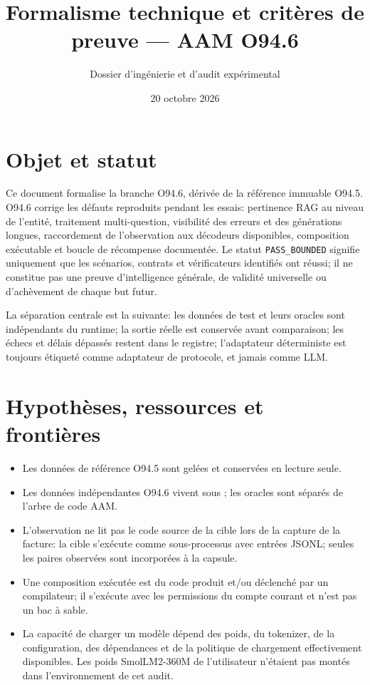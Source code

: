 \documentclass[11pt,a4paper]{article}
\title{Formalisme technique et critères de preuve — AAM O94.6}
\author{Dossier d'ingénierie et d'audit expérimental}
\date{20 octobre 2026}
\begin{document}
\maketitle
\tableofcontents
\section{Objet et statut}
Ce document formalise la branche O94.6, dérivée de la référence immuable O94.5. O94.6 corrige les défauts reproduits pendant les essais: pertinence RAG au niveau de l'entité, traitement multi-question, visibilité des erreurs et des générations longues, raccordement de l'observation aux décodeurs disponibles, composition exécutable et boucle de récompense documentée. Le statut \texttt{PASS\_BOUNDED} signifie uniquement que les scénarios, contrats et vérificateurs identifiés ont réussi; il ne constitue pas une preuve d'intelligence générale, de validité universelle ou d'achèvement de chaque but futur.

La séparation centrale est la suivante: les données de test et leurs oracles sont indépendants du runtime; la sortie réelle est conservée avant comparaison; les échecs et délais dépassés restent dans le registre; l'adaptateur déterministe est toujours étiqueté comme adaptateur de protocole, et jamais comme LLM.

\section{Hypothèses, ressources et frontières}
\begin{itemize}[leftmargin=1.5em]
\item Les données de référence O94.5 sont gelées et conservées en lecture seule.
\item Les données indépendantes O94.6 vivent sous ; les oracles sont séparés de l'arbre de code AAM.
\item L'observation ne lit pas le code source de la cible lors de la capture de la facture: la cible s'exécute comme sous-processus avec entrées JSONL; seules les paires observées sont incorporées à la capsule.
\item Une composition exécutée est du code produit et/ou déclenché par un compilateur; il s'exécute avec les permissions du compte courant et n'est pas un bac à sable.
\item La capacité de charger un modèle dépend des poids, du tokenizer, de la configuration, des dépendances et de la politique de chargement effectivement disponibles. Les poids SmolLM2-360M de l'utilisateur n'étaient pas montés dans l'environnement de cet audit.
\end{itemize}
\end{document}
